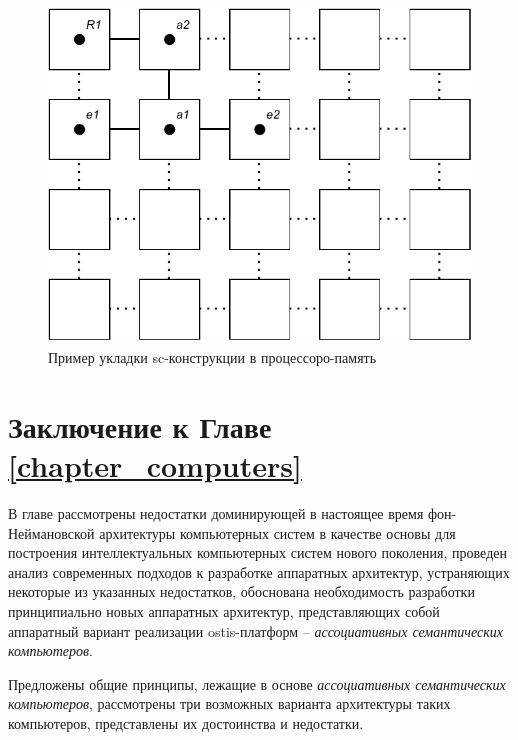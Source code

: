 \begin{figure}[H]
	\includegraphics[scale=1]{images/part6/chapter_computer/fine-grained architecture.pdf}
	\caption{Пример укладки sc-конструкции в процессоро-память}
	\label{fig:fine-grained-architecture}
\end{figure}

\section*{Заключение к Главе \ref{chapter_computers}}
В главе рассмотрены недостатки доминирующей в настоящее время фон-Неймановской архитектуры компьютерных систем в качестве основы для построения интеллектуальных компьютерных систем нового поколения, проведен анализ современных подходов к разработке аппаратных архитектур, устраняющих некоторые из указанных недостатков, обоснована необходимость разработки принципиально новых аппаратных архитектур, представляющих собой аппаратный вариант реализации ostis-платформ -- \textit{ассоциативных семантических компьютеров}.

Предложены общие принципы, лежащие в основе \textit{ассоциативных семантических компьютеров}, рассмотрены три возможных варианта архитектуры таких компьютеров, представлены их достоинства и недостатки.

